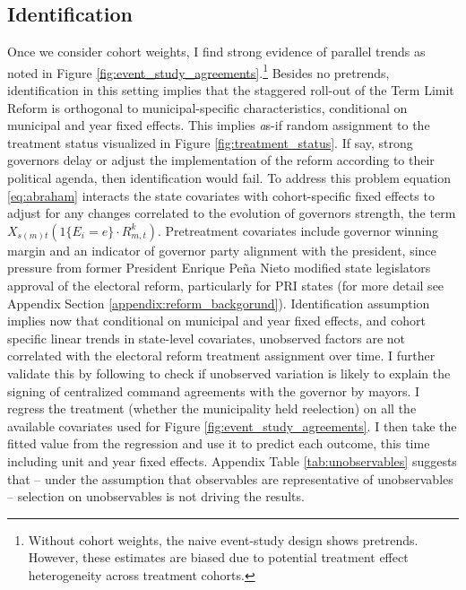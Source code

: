 \subsection{Identification \label{sec:identification}}
 
Once we consider cohort weights, I find strong evidence of parallel trends as noted in Figure \ref{fig:event_study_agreements}.\footnote{Without cohort weights, the naive event-study design shows pretrends. However, these estimates are biased due to potential treatment effect heterogeneity across treatment cohorts.} Besides no pretrends, identification in this setting implies that the staggered roll-out of the Term Limit Reform is orthogonal to municipal-specific characteristics, conditional on municipal and year fixed effects. This implies {\emph as-if} random assignment to the treatment status visualized in Figure \ref{fig:treatment_status}. If say, strong governors delay or adjust the implementation of the reform according to their political agenda, then identification would fail. To address this problem equation \ref{eq:abraham} interacts the state covariates with cohort-specific fixed effects to adjust for any changes correlated to the evolution of governors strength, the term $X_{s(m)t} (1\{E_i=e\} \cdot R^k_{m,t})$. Pretreatment covariates include governor winning margin and an indicator of governor party alignment with the president, since pressure from former President Enrique Peña Nieto modified state legislators approval of the electoral reform, particularly for PRI states (for more detail see Appendix Section \ref{appendix:reform_backgorund}). Identification assumption implies now that conditional on municipal and year fixed effects, and cohort specific linear trends in state-level covariates, unobserved factors are not correlated with the electoral reform treatment assignment over time. I further validate this by following \citet{altonji_etal_2005} to check if unobserved variation is likely to explain the signing of centralized command agreements with the governor by mayors. I regress the treatment (whether the municipality held reelection) on all the available covariates used for Figure \ref{fig:event_study_agreements}. I then take the fitted value from the regression and use it to predict each outcome, this time including unit and year fixed effects. Appendix Table \ref{tab:unobservables} suggests that – under the assumption that observables are representative of unobservables – selection on unobservables is not driving the results. 

